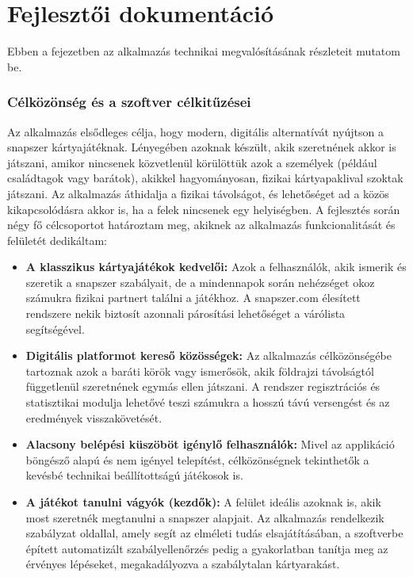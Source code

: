 \chapter{Fejlesztői dokumentáció}
\label{ch:dev_doc}

Ebben a fejezetben az alkalmazás technikai megvalósításának részleteit mutatom be.


\subsection{Célközönség és a szoftver célkitűzései}
\label{subsec:target_audience}

Az alkalmazás elsődleges célja, hogy modern, digitális alternatívát nyújtson a snapszer kártyajátéknak. Lényegében azoknak készült, akik szeretnének akkor is játszani, amikor nincsenek közvetlenül körülöttük azok a személyek (például családtagok vagy barátok), akikkel hagyományosan, fizikai kártyapaklival szoktak játszani. Az alkalmazás áthidalja a fizikai távolságot, és lehetőséget ad a közös kikapcsolódásra akkor is, ha a felek nincsenek egy helyiségben. A fejlesztés során négy fő célcsoportot határoztam meg, akiknek az alkalmazás funkcionalitását és felületét dedikáltam:
\begin{itemize}
    \item \textbf{A klasszikus kártyajátékok kedvelői:} Azok a felhasználók, akik ismerik és szeretik a snapszer szabályait, de a mindennapok során nehézséget okoz számukra fizikai partnert találni a játékhoz. A snapszer.com élesített rendszere nekik biztosít azonnali párosítási lehetőséget a várólista segítségével.
    
    \item \textbf{Digitális platformot kereső közösségek:} Az alkalmazás célközönségébe tartoznak azok a baráti körök vagy ismerősök, akik földrajzi távolságtól függetlenül szeretnének egymás ellen játszani. A rendszer regisztrációs és statisztikai modulja lehetővé teszi számukra a hosszú távú versengést és az eredmények visszakövetését.
    
    \item \textbf{Alacsony belépési küszöböt igénylő felhasználók:} Mivel az applikáció böngésző alapú és nem igényel telepítést, célközönségnek tekinthetők a kevésbé technikai beállítottságú játékosok is.
    
    \item \textbf{A játékot tanulni vágyók (kezdők):} A felület ideális azoknak is, akik most szeretnék megtanulni a snapszer alapjait. Az alkalmazás rendelkezik szabályzat oldallal, amely segít az elméleti tudás elsajátításában, a szoftverbe épített automatizált szabályellenőrzés pedig a gyakorlatban tanítja meg az érvényes lépéseket, megakadályozva a szabálytalan kártyarakást.
    
\end{itemize}

